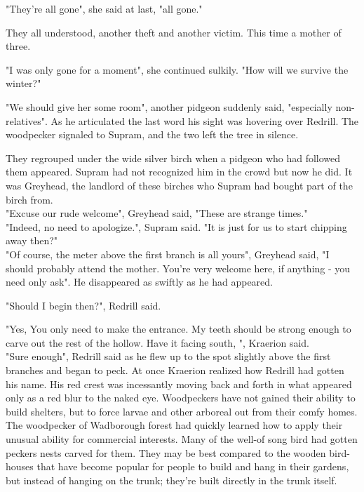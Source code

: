 \documentclass[smalldemyvopaper,11pt,twoside,onecolumn,openright,extrafontsizes]{memoir}
\begin{document}
"They're all gone", she said at last, "all gone."

They all understood, another theft and another victim. This time a mother of three. 

"I was only gone for a moment", she continued sulkily. "How will we survive the winter?"

"We should give her some room", another pidgeon suddenly said, "especially non-relatives". As he articulated the last word his sight was hovering over Redrill. The woodpecker signaled to Supram, and the two left the tree in silence.

They regrouped under the wide silver birch when a pidgeon who had followed them appeared. Supram had not recognized him in the crowd but now he did. It was Greyhead, the landlord of these birches who Supram had bought part of the birch from. \\

"Excuse our rude welcome", Greyhead said, "These are strange times."\\

"Indeed, no need to apologize.", Supram said. "It is just for us to start chipping away then?"\\

"Of course, the meter above the first branch is all yours", Greyhead said, "I should probably attend the mother. You're very welcome here, if anything - you need only ask". He disappeared as swiftly as he had appeared.

"Should I begin then?", Redrill said.

"Yes, You only need to make the entrance. My teeth should be strong enough to carve out the rest of the hollow. Have it facing south, ", Kraerion said.\\

"Sure enough", Redrill said as he flew up to the spot slightly above the first branches and began to peck. At once Kraerion realized how Redrill had gotten his name. His red crest was incessantly moving back and forth in what appeared only as a red blur to the naked eye. Woodpeckers have not gained their ability to build shelters, but to force larvae and other arboreal out from their comfy homes. The woodpecker of Wadborough forest had quickly learned how to apply their unusual ability for commercial interests. Many of the well-of song bird had gotten peckers nests carved for them. They may be best compared to the wooden bird-houses that have become popular for people to build and hang in their gardens, but instead of hanging on the trunk; they're built directly in the trunk itself.
\end{document}
